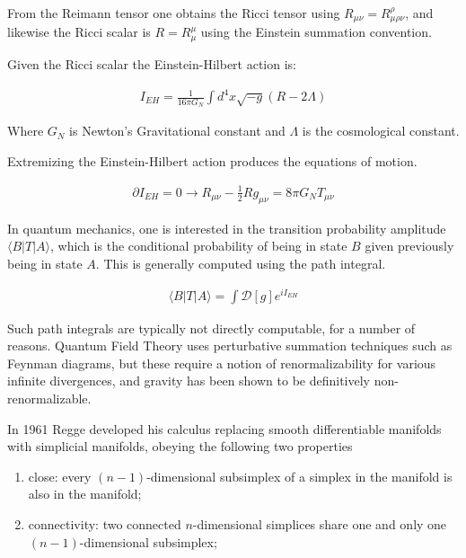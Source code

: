 \documentclass[12pt]{article}
\begin{document}
From the Reimann tensor one obtains the Ricci tensor using $R_{\mu\nu}=R^{\rho}_{\mu\rho\nu}$, and likewise the Ricci scalar is $R=R^{\mu}_{\mu}$ using the Einstein summation convention.

Given the Ricci scalar the Einstein-Hilbert action is:

\begin{align}
I_{EH}=\frac{1}{16\pi G_{N}}\int d^{4}x\sqrt{-g}(R-2\Lambda)
\end{align}

Where $G_{N}$ is Newton's Gravitational constant and $\Lambda$ is the cosmological constant.

Extremizing the Einstein-Hilbert action produces the equations of motion.

\begin{align}
  \partial I_{EH} = 0 \rightarrow R_{\mu\nu}-\frac{1}{2}Rg_{\mu\nu}=8\pi G_{N}T_{\mu\nu}
\end{align}

In quantum mechanics, one is interested in the transition probability amplitude $\langle B|T|A\rangle$, which is the conditional probability of being in state $B$ given previously being in state $A$. This is generally computed using the path integral.

\begin{align}
  \langle B|T|A\rangle=\int\mathcal{D}[g]e^{iI_{EH}}
\end{align}

Such path integrals are typically not directly computable, for a number of reasons. Quantum Field Theory uses perturbative summation techniques such as Feynman diagrams, but these require a notion of renormalizability for various infinite divergences, and gravity has been shown to be definitively non-renormalizable.\cite{shomer_pedagogical_2007}

In 1961 Regge developed his calculus replacing smooth differentiable manifolds with simplicial manifolds, obeying the following two properties\\[-4ex]
\begin{enumerate}\addtolength{\itemsep}{-1.5ex}
\item close: every $(n-1)$-dimensional subsimplex of a simplex in the manifold is also in the manifold;  
\item connectivity: two connected $n$-dimensional simplices share one and only one $(n-1)$-dimensional subsimplex;
\end{enumerate}
\vspace*{-1ex}
\end{document}
